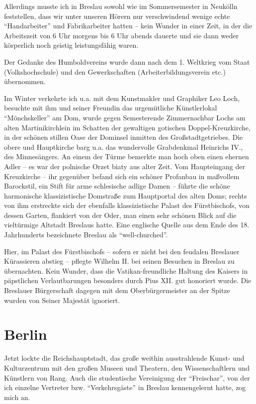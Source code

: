 \documentclass[a5paper,pagesize,10pt,twoside=true]{scrbook}
\renewcommand{\marginpar}[2][]{}
\begin{document}
Allerdings musste ich in Breslau sowohl wie im Sommersemester in Neukölln feststellen, dass wir unter unseren Hörern nur verschwindend wenige echte \enquote{Handarbeiter} und Fabrikarbeiter hatten -- kein Wunder in einer Zeit, in der die Arbeitszeit von 6 Uhr morgens bis 6 Uhr abends dauerte und sie dann weder körperlich noch geistig leistungsfähig waren.

Der Gedanke des Humboldvereins wurde dann nach dem 1. Weltkrieg vom Staat (Volkshochschule) und den Gewerkschaften (Arbeiterbildungsverein etc.) übernommen.

\marginpar{160}
Im Winter verkehrte ich u.a. mit dem Kunstmakler und Graphiker Leo Loch, besuchte mit ihm und seiner Freundin das urgemütliche Künstlerlokal \enquote{Mönchskeller} am Dom, wurde gegen Semesterende Zimmernachbar Lochs am alten Martinikirchlein im Schatten der gewaltigen gotischen Doppel\--Kreuz\-kirche, in der schönen stillen Oase der Dominsel inmitten des Großstadtgetriebes. Die obere und Hauptkirche barg u.a. das wundervolle Grabdenkmal Heinrichs IV., des Minnesängers. An einem der Türme bemerkte man hoch oben einen ehernen Adler -- es war der polnische Orzet biaty aus alter Zeit. Vom Haupteingang der Kreuzkirche -- ihr gegenüber befand sich ein schöner Profanbau in maßvollem Barockstil, ein Stift für arme schlesische adlige Damen -- führte die schöne harmonische klassizistische Domstraße zum Hauptportal des alten Doms; rechts von ihm erstreckte sich der ebenfalls klassizistische Palast des Fürstbischofs, von dessen Garten, flankiert von der Oder, man einen sehr schönen Blick auf die vieltürmige Altstadt Breslaus hatte. Eine englische Quelle aus dem Ende des 18. Jahrhunderts bezeichnete Breslau als \enquote{well-churched}.

Hier, im Palast des Fürstbischofs -- sofern er nicht bei den feudalen Breslauer Kürassieren abstieg -- pflegte Wilhelm II. bei seinen Besuchen in Breslau zu übernachten. Kein Wunder, dass die Vatikan-freundliche Haltung des Kaisers in päpstlichen Verlautbarungen besonders durch Pius XII. gut honoriert wurde. Die Breslauer Bürgerschaft dagegen mit dem Oberbürgermeister an der Spitze wurden von Seiner Majestät ignoriert.


\section{Berlin}

Jetzt lockte die Reichshauptstadt, das große weithin ausstrahlende Kunst- und Kulturzentrum mit den großen Museen und Theatern, den Wissenschaftlern und Künstlern von Rang. Auch die studentische Vereinigung der \enquote{Freischar}, von der ich einzelne Vertreter bzw. \enquote{Verkehrsgäste} in Breslau kennengelernt hatte, zog mich an.
\end{document}
